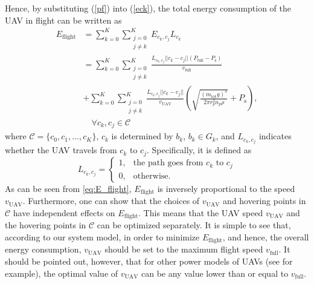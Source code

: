 \documentclass[journal]{IEEEtran}
\begin{document}
    Hence, {by substituting (\ref{pf}) into (\ref{eck}), the total energy consumption of the UAV in flight can be written as
    \begin{align}\label{eq:E_flight}
        E_{\text{flight}} &= \sum_{k=0}^{K} \sum_{\substack{j=0 \\ j \neq k}}^{K} E_{c_{k},c_{j}}L_{c_{k}} \nonumber \\
         & = \sum_{k=0}^{K} \sum_{\substack{j=0 \\ j \neq k}}^{K}\frac{L_{c_{k},c_{j}}||c_k-c_j|| \left(P_{\text{full}}-P_{\text{s}} \right)}{v_\text{full}} \nonumber \\
         & + \sum_{k=0}^{K} \sum_{\substack{j=0 \\ j \neq k}}^{K}\frac{L_{c_{k},c_{j}}||c_k-c_j||}{v_\text{UAV}} \left(\sqrt{\frac{\left(m_{\text{tot}}g \right)^3}{2 \pi r^2_{p}n_{p}\rho}} + P_{\text{s}} \right), \nonumber \\
         &\quad \forall{c_k,c_j} \in {\mathcal{C}}
    \end{align}} where $\mathcal{C} = \{c_0,c_1,\dots, c_K\}$, $c_k$ is determined by $b_k$, $b_k \in G_k$, and  $L_{c_k,c_j}$ indicates whether the UAV travels from $c_k$ to $c_j$. Specifically, it is defined as
	\begin{equation}
	\label{visit}
	L_{c_k,c_j} = \left\{ \begin{array}{ll}
	1,& \text{the path goes from $c_k$ to $c_j$}\\
	0,& \text{otherwise}.
	\end{array} \right.
	\end{equation}
	As can be seen from \eqref{eq:E_flight}, $E_{\text{flight}}$ is inversely proportional to the speed $v_{\text{UAV}}$. Furthermore, one can show that the choices of $v_{\text{UAV}}$ and hovering points in $\mathcal{C}$ have independent effects on $E_{\text{flight}}$. This means that the UAV speed $v_{\text{UAV}}$ and the hovering points in  $\mathcal{C}$ can be optimized separately. It is simple to see that, according to our system model, in order to minimize $E_{\text{flight}}$, and hence, the overall energy consumption, $v_{\text{UAV}}$ should be set to the maximum flight speed $v_{\text{full}}$. It should be pointed out, however, that for other power models of UAVs (see \cite{Y. Zeng} for example), the optimal value of $v_{\text{UAV}}$ can be any value lower than or equal to $v_{\text{full}}$.
\end{document}
